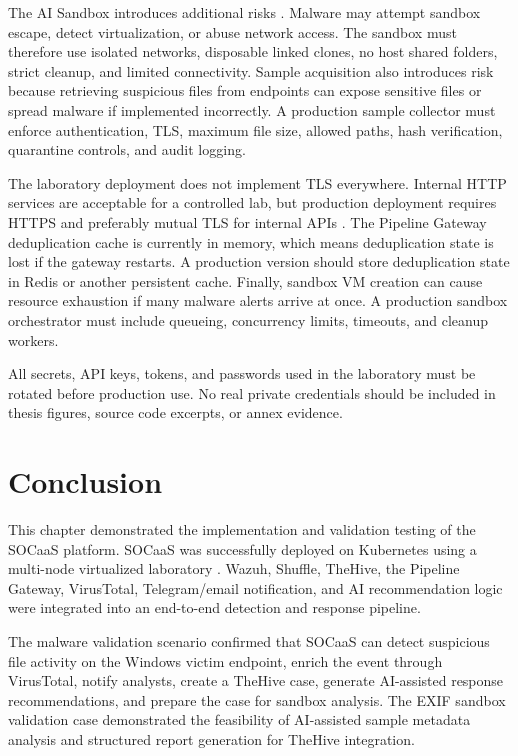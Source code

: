 The AI Sandbox introduces additional risks \cite{ch4-nist-malware-guide}. Malware may attempt sandbox escape, detect virtualization, or abuse network access. The sandbox must therefore use isolated networks, disposable linked clones, no host shared folders, strict cleanup, and limited connectivity. Sample acquisition also introduces risk because retrieving suspicious files from endpoints can expose sensitive files or spread malware if implemented incorrectly. A production sample collector must enforce authentication, TLS, maximum file size, allowed paths, hash verification, quarantine controls, and audit logging.

The laboratory deployment does not implement TLS everywhere. Internal HTTP services are acceptable for a controlled lab, but production deployment requires HTTPS and preferably mutual TLS for internal APIs \cite{ch4-owasp-api-security}. The Pipeline Gateway deduplication cache is currently in memory, which means deduplication state is lost if the gateway restarts. A production version should store deduplication state in Redis or another persistent cache. Finally, sandbox VM creation can cause resource exhaustion if many malware alerts arrive at once. A production sandbox orchestrator must include queueing, concurrency limits, timeouts, and cleanup workers.

All secrets, API keys, tokens, and passwords used in the laboratory must be rotated before production use. No real private credentials should be included in thesis figures, source code excerpts, or annex evidence.

\section{Conclusion}
\label{sec:ch4-conclusion}

This chapter demonstrated the implementation and validation testing of the SOCaaS platform. SOCaaS was successfully deployed on Kubernetes using a multi-node virtualized laboratory \cite{ch4-kubernetes-docs,ch4-kvm-docs}. Wazuh, Shuffle, TheHive, the Pipeline Gateway, VirusTotal, Telegram/email notification, and AI recommendation logic were integrated into an end-to-end detection and response pipeline.

The malware validation scenario confirmed that SOCaaS can detect suspicious file activity on the Windows victim endpoint, enrich the event through VirusTotal, notify analysts, create a TheHive case, generate AI-assisted response recommendations, and prepare the case for sandbox analysis. The EXIF sandbox validation case demonstrated the feasibility of AI-assisted sample metadata analysis and structured report generation for TheHive integration.

